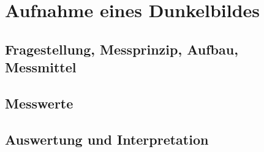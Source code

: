 %
%
\chapter{Aufnahme eines Dunkelbildes}

\label{chap:Aufnahme_eines_Dunkelbildes}

\section{Fragestellung, Messprinzip, Aufbau, Messmittel}

\label{chap:VERSUCH_2_FRAGESTELLUNG}

\section{Messwerte}
\label{chap:VERSUCH_2_MESSWERTE}

\section{Auswertung und Interpretation}
